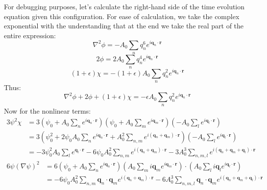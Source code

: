 \documentclass[reqno]{article}
\begin{document}
For debugging purposes, let's calculate the right-hand side of the time evolution equation given this configuration.
For ease of calculation, we take the complex exponential with the understanding that at the end we take the real part of the entire expression:
\begin{equation*}
    \nabla^2 \phi
    = - A_0 \sum_n q_n^6 e^{i \mathbf{q}_n \cdot \mathbf{r}}
\end{equation*}
\begin{equation*}
    2 \phi
    = 2 A_0 \sum_n q_n^4 e^{i \mathbf{q}_n \cdot \mathbf{r}}
\end{equation*}
\begin{equation*}
    (1 + \epsilon) \chi
    = -(1 + \epsilon) A_0 \sum_n q_n^2 e^{i \mathbf{q}_n \cdot \mathbf{r}}
\end{equation*}
Thus:
\begin{equation}
    \nabla^2 \phi + 2\phi +(1 + \epsilon)\chi
    = -\epsilon A_0 \sum_n q_n^2 e^{i \mathbf{q}_n \cdot \mathbf{r}}
\end{equation}
Now for the nonlinear terms:
\begin{equation*}
    \begin{split}
        3 \psi^2 \chi
        &=
        3 \left(\psi_0 + A_0 \sum_n e^{i \mathbf{q}_n \cdot \mathbf{r}}\right)
        \left(\psi_0 + A_0 \sum_m e^{i \mathbf{q}_m \cdot \mathbf{r}}\right)
        \left(-A_0 \sum_l e^{i \mathbf{q}_l \cdot \mathbf{r}} \right) \\
        &=
        3\left(\psi_0^2 
        + 2 \psi_0 A_0 \sum_n e^{i \mathbf{q}_n \cdot \mathbf{r}}
        + A_0^2 \sum_{n, m} e^{i \left(\mathbf{q}_n + \mathbf{q}_m\right) \cdot \mathbf{r}}
        \right)
        \left(-A_0 \sum_l e^{i \mathbf{q}_l \cdot \mathbf{r}} \right) \\
        &=
        -3 \psi_0^2 A_0 \sum_l e^{\mathbf{q}_l \cdot \mathbf{r}}
        - 6 \psi_0 A_0^2 \sum_{n, m} e^{i \left(\mathbf{q}_n + \mathbf{q}_m\right) \cdot \mathbf{r}}
        -3 A_0^3 \sum_{n, m, l} e^{i \left(\mathbf{q}_n + \mathbf{q}_m + \mathbf{q}_l\right) \cdot \mathbf{r}}
    \end{split}
\end{equation*}
\begin{equation*}
    \begin{split}
        6 \psi \left(\nabla \psi\right)^2
        &=
        6 \left(\psi_0 + A_0 \sum_n e^{i \mathbf{q}_n \cdot \mathbf{r}} \right)
        \left(A_0 \sum_m i\mathbf{q}_m e^{i \mathbf{q}_m \cdot \mathbf{r}} \right) \cdot
        \left(A_0 \sum_l i\mathbf{q}_l e^{i \mathbf{q}_l \cdot \mathbf{r}} \right) \\
        &=
        -6\psi_0 A_0^2 \sum_{n, m} \mathbf{q}_n \cdot \mathbf{q}_m e^{i \left(\mathbf{q}_n + \mathbf{q}_m\right) \cdot \mathbf{r}}
        -6 A_0^3 \sum_{n, m, l} \mathbf{q}_n \cdot \mathbf{q}_m e^{i \left(\mathbf{q}_n + \mathbf{q}_m + \mathbf{q}_l\right) \cdot \mathbf{r}}
    \end{split}
\end{equation*}
\end{document}
